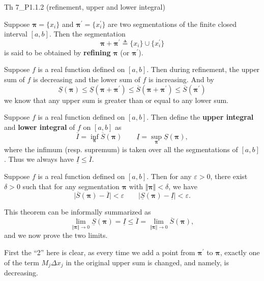 \documentclass{article}
\newcommand{\lsum}[1]{\underline{S}(\pmb{#1})}
\newcommand{\usum}[1]{\overline{S}(\pmb{#1})}
\begin{document}
\begin{Th}{Th 7\_P1.1.2 (refinement, upper and lower integral)}
    \begin{compactenum}
        \item \textcolor{Df}{Suppose $\pmb{\pi} = \{x_i\}$ and $\pmb{\pi}^\prime = \{x^\prime_i\}$ are two segmentations of the finite closed interval $[a,b]$. Then the segmentation
        $$ \pmb{\pi} + \pmb{\pi}^\prime \triangleq \{x_i\} \cup \{x^\prime_i\} $$
        is said to be obtained by \textbf{refining} $\pmb{\pi}$ (or $\pmb{\pi}^\prime$).}
        \item Suppose $f$ is a real function defined on $[a,b]$. Then during refinement, the upper sum of $f$ is decreasing and the lower sum of $f$ is increasing. And by
        $$ \lsum{\pi} \leqslant \lsum{\pi+\pi^\prime} \leqslant \usum{\pi+\pi^\prime} \leqslant \usum{\pi^\prime} $$
        we know that any upper sum is greater than or equal to any lower sum.
        \item \textcolor{Df}{Suppose $f$ is a real function defined on $[a,b]$. Then define the \textbf{upper integral} and \textbf{lower integral} of $f$ on $[a,b]$ as
        $$ \overline{I} = \inf_{\pmb{\pi}} \usum{\pi} \qquad \underline{I} = \sup_{\pmb{\pi}} \lsum{\pi}, $$
        where the infimum (resp. supremum) is taken over all the segmentations of $[a,b]$.} Thus we always have $\underline{I} \leqslant \overline{I}$.
        \item Suppose $f$ is a real function defined on $[a,b]$. Then for any $\varepsilon > 0$, there exist $\delta > 0$ such that for any segmentation $\pmb{\pi}$ with $\Vert\pmb{\pi}\Vert < \delta$, we have
        $$ \vert \usum{\pi} - \overline{I} \vert < \varepsilon \qquad \vert \lsum{\pi} - \underline{I} \vert < \varepsilon. $$
    \end{compactenum}
\end{Th}

This theorem can be informally summarized as
$$ \lim_{\Vert\pmb{\pi}\Vert\to 0} \lsum{\pi} = \underline{I} \leqslant \overline{I} = \lim_{\Vert\pmb{\pi}\Vert\to 0} \usum{\pi}, $$
and we now prove the two limits.

First the ``2'' here is clear, as every time we add a point from $\pmb{\pi}^\prime$ to $\pmb{\pi}$, exactly one of the term $M_j\Delta x_j$ in the original upper sum is changed, and namely, is decreasing.
\end{document}
